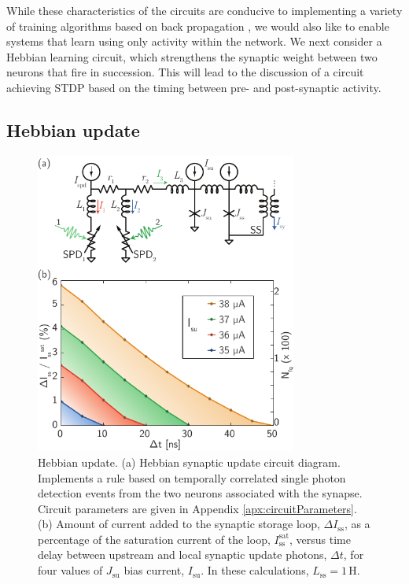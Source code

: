 \documentclass[twocolumn]{article}
\begin{document}
While these characteristics of the circuits are conducive to implementing a variety of training algorithms based on back propagation \cite{ni2015}, we would also like to enable systems that learn using only activity within the network. We next consider a Hebbian learning circuit, which strengthens the synaptic weight between two neurons that fire in succession. This will lead to the discussion of a circuit achieving STDP based on the timing between pre- and post-synaptic activity.
	
\subsection{\label{sec:Hebbian}Hebbian update}
\begin{figure}[t!]
	\centerline{\includegraphics[width=8.6cm]{_synapticPlasticity_Hebbian_1_small.pdf}}
	\caption{\label{fig:synapticPlasticity_Hebbian_1}Hebbian update. (a) Hebbian synaptic update circuit diagram. Implements a rule based on temporally correlated single photon detection events from the two neurons associated with the synapse. Circuit parameters are given in Appendix \ref{apx:circuitParameters}. (b) Amount of current added to the synaptic storage loop, $\Delta I_{\mathrm{ss}}$, as a percentage of the saturation current of the loop, $I_{\mathrm{ss}}^{\mathrm{sat}}$, versus time delay between upstream and local synaptic update photons, $\Delta t$, for four values of $J_{\mathrm{su}}$ bias current, $I_{\mathrm{su}}$. In these calculations, $L_{\mathrm{ss}} = 1$\,\textmu H.}
\end{figure}
\end{document}
